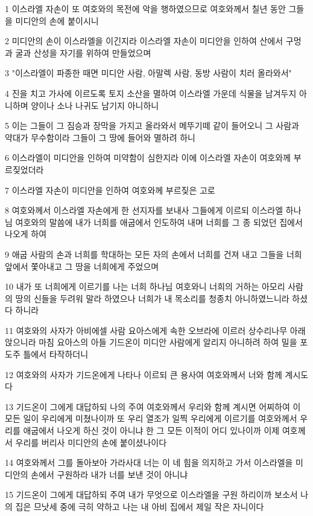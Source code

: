 \par 1 이스라엘 자손이 또 여호와의 목전에 악을 행하였으므로 여호와께서 칠년 동안 그들을 미디안의 손에 붙이시니
\par 2 미디안의 손이 이스라엘을 이긴지라 이스라엘 자손이 미디안을 인하여 산에서 구멍과 굴과 산성을 자기를 위하여 만들었으며
\par 3 "이스라엘이 파종한 때면 미디안 사람, 아말렉 사람, 동방 사람이 치러 올라와서"
\par 4 진을 치고 가사에 이르도록 토지 소산을 멸하여 이스라엘 가운데 식물을 남겨두지 아니하며 양이나 소나 나귀도 남기지 아니하니
\par 5 이는 그들이 그 짐승과 장막을 가지고 올라와서 메뚜기떼 같이 들어오니 그 사람과 약대가 무수함이라 그들이 그 땅에 들어와 멸하려 하니
\par 6 이스라엘이 미디안을 인하여 미약함이 심한지라 이에 이스라엘 자손이 여호와께 부르짖었더라
\par 7 이스라엘 자손이 미디안을 인하여 여호와께 부르짖은 고로
\par 8 여호와께서 이스라엘 자손에게 한 선지자를 보내사 그들에게 이르되 이스라엘 하나님 여호와의 말씀에 내가 너희를 애굽에서 인도하여 내며 너희를 그 종 되었던 집에서 나오게 하여
\par 9 애굽 사람의 손과 너희를 학대하는 모든 자의 손에서 너희를 건져 내고 그들을 너희 앞에서 쫓아내고 그 땅을 너희에게 주었으며
\par 10 내가 또 너희에게 이르기를 나는 너희 하나님 여호와니 너희의 거하는 아모리 사람의 땅의 신들을 두려워 말라 하였으나 너희가 내 목소리를 청종치 아니하였느니라 하셨다 하니라
\par 11 여호와의 사자가 아비에셀 사람 요아스에게 속한 오브라에 이르러 상수리나무 아래 앉으니라 마침 요아스의 아들 기드온이 미디안 사람에게 알리지 아니하려 하여 밀을 포도주 틀에서 타작하더니
\par 12 여호와의 사자가 기드온에게 나타나 이르되 큰 용사여 여호와께서 너와 함께 계시도다
\par 13 기드온이 그에게 대답하되 나의 주여 여호와께서 우리와 함께 계시면 어찌하여 이 모든 일이 우리에게 미쳤나이까 또 우리 열조가 일찍 우리에게 이르기를 여호와께서 우리를 애굽에서 나오게 하신 것이 아니냐 한 그 모든 이적이 어디 있나이까 이제 여호께서 우리를 버리사 미디안의 손에 붙이셨나이다
\par 14 여호와께서 그를 돌아보아 가라사대 너는 이 네 힘을 의지하고 가서 이스라엘을 미디안의 손에서 구원하라 내가 너를 보낸 것이 아니냐
\par 15 기드온이 그에게 대답하되 주여 내가 무엇으로 이스라엘을 구원 하리이까 보소서 나의 집은 므낫세 중에 극히 약하고 나는 내 아비 집에서 제일 작은 자니이다
